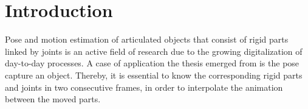 \chapter{Introduction}
\label{cha:Introduction}

Pose and motion estimation of articulated objects that consist of rigid parts linked by joints is an active field of research due to the growing digitalization of day-to-day processes. A case of application the thesis emerged from is the pose capture an object. Thereby, it is essential to know the corresponding rigid parts and joints in two consecutive frames, in order to interpolate the animation between the moved parts.


